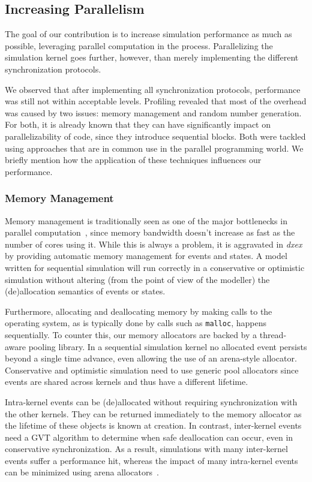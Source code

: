 \subsection{Increasing Parallelism}
The goal of our contribution is to increase simulation performance as much as possible, leveraging parallel computation in the process.
Parallelizing the simulation kernel goes further, however, than merely implementing the different synchronization protocols.

We observed that after implementing all synchronization protocols, performance was still not within acceptable levels.
Profiling revealed that most of the overhead was caused by two issues: memory management and random number generation.
For both, it is already known that they can have significantly impact on parallelizability of code, since they introduce sequential blocks.
Both were tackled using approaches that are in common use in the parallel programming world.
We briefly mention how the application of these techniques influences our performance.

\subsubsection{Memory Management}
\label{sec:4-subsec:overhead-pgraph:memory}
Memory management is traditionally seen as one of the major bottlenecks in parallel computation~\cite{Memory}, since memory bandwidth doesn't increase as fast as the number of cores using it.
While this is always a problem, it is aggravated in \textit{dxex} by providing automatic memory management for events and states.
A model written for sequential simulation will run correctly in a conservative or optimistic simulation without altering (from the point of view of the modeller) the (de)allocation semantics of events or states.

Furthermore, allocating and deallocating memory by making calls to the operating system, as is typically done by calls such as \texttt{malloc}, happens sequentially.
To counter this, our memory allocators are backed by a thread-aware pooling library.
In a sequential simulation kernel no allocated event persists beyond a single time advance, even allowing the use of an arena-style allocator.
Conservative and optimistic simulation need to use generic pool allocators since events are shared across kernels and thus have a different lifetime.

Intra-kernel events can be (de)allocated without requiring synchronization with the other kernels. 
They can be returned immediately to the memory allocator as the lifetime of these objects is known at creation.
In contrast, inter-kernel events need a GVT algorithm to determine when safe deallocation can occur, even in conservative synchronization.
As a result, simulations with many inter-kernel events suffer a performance hit, whereas the impact of many intra-kernel events can be minimized using arena allocators~\cite{Arena}.

